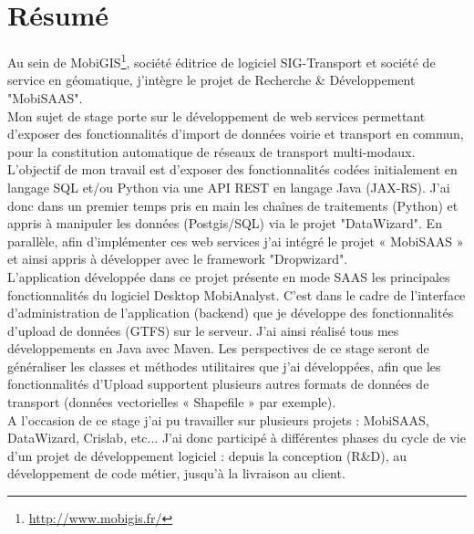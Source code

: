 \chapter*{Résumé}\label{Resume}

Au sein de MobiGIS\footnote{\url{http://www.mobigis.fr/}}, société éditrice de logiciel SIG-Transport et société de service en géomatique, j'intègre le projet de Recherche \& Développement "MobiSAAS".\\

Mon sujet de stage porte sur le développement de web services permettant d'exposer des fonctionnalités d'import de données voirie et transport en commun, pour la constitution automatique de réseaux de transport multi-modaux. \\

L'objectif de mon travail est d'exposer des fonctionnalités codées initialement en langage SQL et/ou Python via une API REST en langage Java (JAX-RS). J'ai donc dans un premier temps pris en main les chaînes de traitements (Python) et appris à manipuler les données (Postgis/SQL) via le projet "DataWizard". En parallèle, afin d'implémenter ces web services j'ai intégré le projet « MobiSAAS » et ainsi appris à développer avec le framework "Dropwizard". \\

L'application développée dans ce projet présente en mode SAAS les principales fonctionnalités du logiciel Desktop MobiAnalyst. C'est dans le cadre de l'interface d'administration de l'application (backend) que je développe des fonctionnalités d'upload de données (GTFS) sur le serveur. J'ai ainsi réalisé tous mes développements en Java avec Maven. Les perspectives de ce stage seront de généraliser les classes et méthodes utilitaires que j'ai développées, afin que les fonctionnalités d'Upload supportent plusieurs autres formats de données de transport (données vectorielles « Shapefile » par exemple).\\

A l'occasion de ce stage j'ai pu travailler sur plusieurs projets : MobiSAAS, DataWizard,  Crislab, etc... J'ai donc participé à différentes phases du cycle de vie d'un projet de développement logiciel : depuis la conception (R\&D), au développement de code métier, jusqu'à la livraison au client.\\